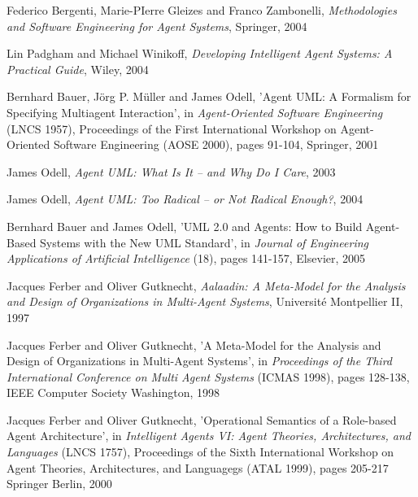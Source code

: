 \begin{thebibliography}{99}

Federico Bergenti, Marie-PIerre Gleizes and Franco Zambonelli,
\textit{Methodologies and Software Engineering for Agent Systems},
Springer, 2004

Lin Padgham and Michael Winikoff,
\textit{Developing Intelligent Agent Systems: A Practical Guide},
Wiley, 2004


Bernhard Bauer, J\"{o}rg P. M\"{u}ller and James Odell,
'Agent UML: A Formalism for Specifying Multiagent Interaction',
in \textit{Agent-Oriented Software Engineering} (LNCS 1957),
Proceedings of the First International Workshop on Agent-Oriented Software Engineering (AOSE 2000),
pages 91-104,
Springer, 2001

James Odell,
\textit{Agent UML: What Is It -- and Why Do I Care},
2003

James Odell,
\textit{Agent UML: Too Radical -- or Not Radical Enough?},
2004

Bernhard Bauer and James Odell,
'UML 2.0 and Agents: How to Build Agent-Based Systems with the New UML Standard',
in \textit{Journal of Engineering Applications of Artificial Intelligence} (18),
pages 141-157,
Elsevier, 2005


Jacques Ferber and Oliver Gutknecht,
\textit{Aalaadin: A Meta-Model for the Analysis and Design of Organizations in Multi-Agent Systems},
Université Montpellier II, 1997

Jacques Ferber and Oliver Gutknecht,
'A Meta-Model for the Analysis and Design of Organizations in Multi-Agent Systems',
in \textit{Proceedings of the Third International Conference on Multi Agent Systems} (ICMAS 1998),
pages 128-138, 
IEEE Computer Society Washington, 1998

Jacques Ferber and Oliver Gutknecht,
'Operational Semantics of a Role-based Agent Architecture',
in \textit{Intelligent Agents VI: Agent Theories, Architectures, and Languages} (LNCS 1757),
Proceedings of the Sixth International Workshop on Agent Theories, Architectures, and Languagegs (ATAL 1999),
pages 205-217
Springer Berlin, 2000


\end{thebibliography}
